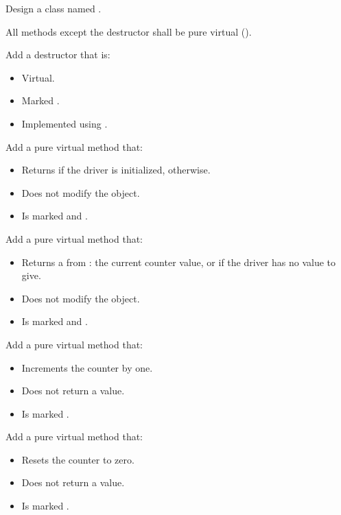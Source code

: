Design a class named .

All methods except the destructor shall be pure virtual ().

Add a destructor that is:
\begin{itemize}
  \item Virtual.
  \item Marked .
  \item Implemented using .
\end{itemize}

Add a pure virtual method  that:
\begin{itemize}
  \item Returns  if the driver is initialized,  otherwise.
  \item Does not modify the object.
  \item Is marked  and \code{[[nodiscard]]}.
\end{itemize}

Add a pure virtual method  that:
\begin{itemize}
  \item Returns a  from : the current
    counter value, or  if the driver has no value to give.
  \item Does not modify the object.
  \item Is marked  and \code{[[nodiscard]]}.
\end{itemize}

Add a pure virtual method  that:
\begin{itemize}
  \item Increments the counter by one.
  \item Does not return a value.
  \item Is marked .
\end{itemize}

Add a pure virtual method  that:
\begin{itemize}
  \item Resets the counter to zero.
  \item Does not return a value.
  \item Is marked .
\end{itemize}


